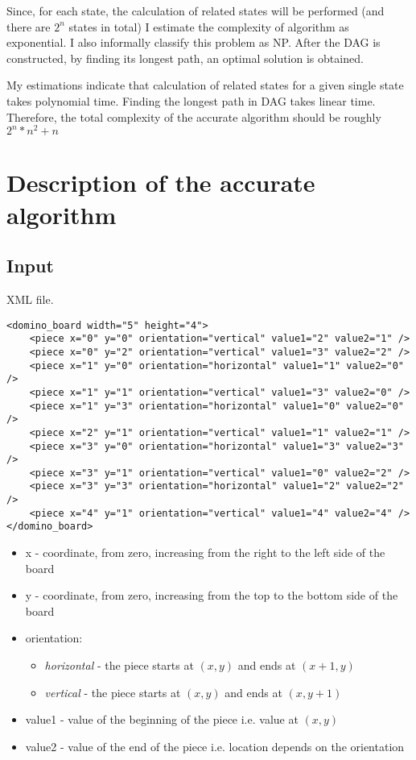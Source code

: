 \documentclass{article}
\begin{document}
Since, for each state, the calculation of related states will be performed (and there are $2^n$ states in total)
I estimate the complexity of algorithm as exponential. I also informally classify 
this problem as NP. After the DAG is constructed, by finding its longest path, an optimal 
solution is obtained.

My estimations indicate that calculation of related states for a given single 
state takes polynomial time. Finding the longest path in DAG takes linear time. 
Therefore, the total complexity of the accurate algorithm should be roughly $ 2^n * n^2 + n $

\section{Description of the accurate algorithm}
\subsection{Input}
XML file.
\begin{verbatim}
<domino_board width="5" height="4"> 
    <piece x="0" y="0" orientation="vertical" value1="2" value2="1" /> 
    <piece x="0" y="2" orientation="vertical" value1="3" value2="2" /> 
    <piece x="1" y="0" orientation="horizontal" value1="1" value2="0" /> 
    <piece x="1" y="1" orientation="vertical" value1="3" value2="0" /> 
    <piece x="1" y="3" orientation="horizontal" value1="0" value2="0" /> 
    <piece x="2" y="1" orientation="vertical" value1="1" value2="1" /> 
    <piece x="3" y="0" orientation="horizontal" value1="3" value2="3" /> 
    <piece x="3" y="1" orientation="vertical" value1="0" value2="2" /> 
    <piece x="3" y="3" orientation="horizontal" value1="2" value2="2" /> 
    <piece x="4" y="1" orientation="vertical" value1="4" value2="4" /> 
</domino_board>
\end{verbatim}

\begin{itemize}[noitemsep,nolistsep]
  \item x - coordinate, from zero, increasing from the right to the left side of the board
  \item y - coordinate, from zero, increasing from the top to the bottom side of the board
  \item orientation:
	\begin{itemize}[noitemsep,nolistsep]
  	\item \emph{horizontal} - the piece starts at $(x,y)$ and ends at $(x+1,y)$
  	\item \emph{vertical} - the piece starts at $(x,y)$ and ends at $(x,y+1)$
	\end{itemize}
  \item value1 - value of the beginning of the piece i.e. value at $(x,y)$
  \item value2 - value of the end of the piece i.e. location depends on the orientation
\end{itemize}
\end{document}
